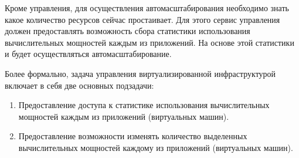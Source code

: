 Кроме управления, для осуществления автомасштабирования необходимо знать какое количество ресурсов сейчас простаивает.
Для этого сервис управления должен предоставлять возможность сбора статистики использования вычислительных мощностей каждым из приложений.
На основе этой статистики и будет осуществляться автомасштабирование.

Более формально, задача управления виртуализированной инфраструктурой включает в себя две основных подзадачи:
\begin{enumerate}
    \item Предоставление доступа к статистике использования вычислительных мощностей каждым из приложений (виртуальных машин).
    \item Предоставление возможности изменять количество выделенных вычислительных мощностей каждому из приложений (виртуальных машин).
\end{enumerate}
